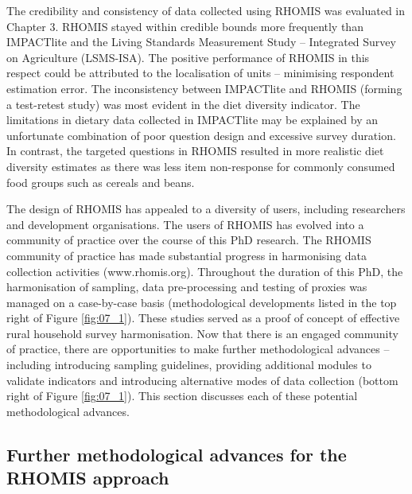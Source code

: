 The credibility and consistency of data collected using RHOMIS was evaluated in Chapter 3. RHOMIS stayed within credible bounds more frequently than IMPACTlite and the Living Standards Measurement Study -- Integrated Survey on Agriculture (LSMS-ISA). The positive performance of RHOMIS in this respect could be attributed to the localisation of units -- minimising respondent estimation error. The inconsistency between IMPACTlite and RHOMIS (forming a test-retest study) was most evident in the diet diversity indicator. The limitations in dietary data collected in IMPACTlite may be explained by an unfortunate combination of poor question design and excessive survey duration. In contrast, the targeted questions in RHOMIS resulted in more realistic diet diversity estimates as there was less item non-response for commonly consumed food groups such as cereals and beans.

The design of RHOMIS has appealed to a diversity of users, including researchers and development organisations. The users of RHOMIS has evolved into a community of practice over the course of this PhD research. The RHOMIS community of practice has made substantial progress in harmonising data collection activities (www.rhomis.org). Throughout the duration of this PhD, the harmonisation of sampling, data pre-processing and testing of proxies was managed on a case-by-case basis (methodological developments listed in the top right of Figure \ref{fig:07_1}). These studies served as a proof of concept of effective rural household survey harmonisation. Now that there is an engaged community of practice, there are opportunities to make further methodological advances -- including introducing sampling guidelines, providing additional modules to validate indicators and introducing alternative modes of data collection (bottom right of Figure \ref{fig:07_1}). This section discusses each of these potential methodological advances.


\subsection{Further methodological advances for the RHOMIS approach}

